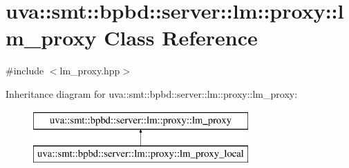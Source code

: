 \hypertarget{classuva_1_1smt_1_1bpbd_1_1server_1_1lm_1_1proxy_1_1lm__proxy}{}\section{uva\+:\+:smt\+:\+:bpbd\+:\+:server\+:\+:lm\+:\+:proxy\+:\+:lm\+\_\+proxy Class Reference}
\label{classuva_1_1smt_1_1bpbd_1_1server_1_1lm_1_1proxy_1_1lm__proxy}


{\ttfamily \#include $<$lm\+\_\+proxy.\+hpp$>$}

Inheritance diagram for uva\+:\+:smt\+:\+:bpbd\+:\+:server\+:\+:lm\+:\+:proxy\+:\+:lm\+\_\+proxy\+:\begin{figure}[H]
\begin{center}
\leavevmode
\includegraphics[height=2.000000cm]{classuva_1_1smt_1_1bpbd_1_1server_1_1lm_1_1proxy_1_1lm__proxy}
\end{center}
\end{figure}
